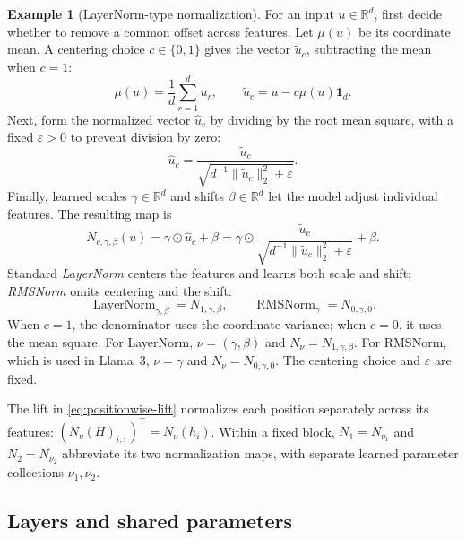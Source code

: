 \documentclass[11pt,twoside]{article}
\newcommand{\R}{\mathbb R}
\theoremstyle{plain}
\theoremstyle{definition}
\newtheorem{example}{Example}[section]
\theoremstyle{remark}
\begin{document}
\begin{example}[LayerNorm-type normalization]
\label{rem:rmsnorm}
For an input $u\in\R^d$, first decide whether to remove a common offset
across features. Let $\mu(u)$ be its coordinate mean. A centering choice
$c\in\{0,1\}$ gives the vector $\widetilde u_c$, subtracting the mean when $c=1$:
\[
\mu(u)=\frac1d\sum_{r=1}^d u_r,
\qquad \widetilde u_c=u-c\mu(u)\mathbf 1_d.
\]
Next, form the normalized vector $\widehat u_c$ by dividing by the root
mean square, with a fixed $\varepsilon>0$ to prevent division by zero:
\[
\widehat u_c=
\frac{\widetilde u_c}{\sqrt{d^{-1}\|\widetilde u_c\|_2^2+\varepsilon}}.
\]
Finally, learned scales $\gamma\in\R^d$ and shifts $\beta\in\R^d$ let
the model adjust individual features. The resulting map is
\begin{equation}
N_{c,\gamma,\beta}(u)=\gamma\odot\widehat u_c+\beta
=\gamma\odot
\frac{\widetilde u_c}{\sqrt{d^{-1}\|\widetilde u_c\|_2^2+\varepsilon}}
+\beta.
\label{eq:normalization-family}
\end{equation}
Standard \emph{LayerNorm} centers the features and learns both scale and shift;
\emph{RMSNorm} omits centering and the shift:
\begin{equation}
\operatorname{LayerNorm}_{\gamma,\beta}=N_{1,\gamma,\beta},
\qquad
\operatorname{RMSNorm}_{\gamma}=N_{0,\gamma,0}.
\label{eq:rmsnorm}
\end{equation}
When $c=1$, the denominator uses the coordinate variance; when $c=0$,
it uses the mean square. For LayerNorm, $\nu=(\gamma,\beta)$ and
$N_\nu=N_{1,\gamma,\beta}$. For RMSNorm, which is used in Llama~3,
$\nu=\gamma$ and $N_\nu=N_{0,\gamma,0}$. The centering choice and
$\varepsilon$ are fixed.
\end{example}

The lift in \eqref{eq:positionwise-lift} normalizes each position
separately across its features: $(N_\nu(H)_{i,:})^\top=N_\nu(h_i)$.
Within a fixed block, $N_1=N_{\nu_1}$ and $N_2=N_{\nu_2}$ abbreviate its
two normalization maps, with separate learned parameter collections
$\nu_1,\nu_2$.

\subsection{Layers and shared parameters}
\end{document}
